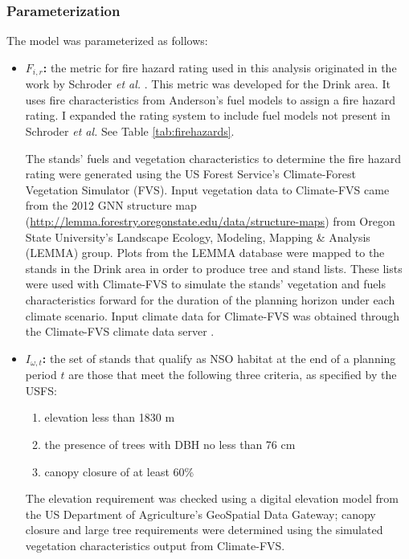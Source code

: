 \subsubsection{Parameterization}
The model was parameterized as follows:
\begin{itemize}
\item \textbf{$F_{i,r}$:} the metric for fire hazard rating used in this analysis originated in the work by Schroder \textit{et al.} \cite{schroder2016multi}. This metric was developed for the Drink area. It uses fire characteristics from Anderson's fuel models \cite{anderson1982aids} to assign a fire hazard rating. I expanded the rating system to include fuel models not present in Schroder \textit{et al.} See Table \ref{tab:firehazards}.

The stands' fuels and vegetation characteristics to determine the fire hazard rating were generated using the US Forest Service's Climate-Forest Vegetation Simulator (FVS). Input vegetation data to Climate-FVS came from the 2012 GNN structure map (\url{http://lemma.forestry.oregonstate.edu/data/structure-maps}) from Oregon State University's Landscape Ecology, Modeling, Mapping \& Analysis (LEMMA) group. Plots from the LEMMA database were mapped to the stands in the Drink area in order to produce tree and stand lists. These lists were used with Climate-FVS to simulate the stands' vegetation and fuels characteristics forward for the duration of the planning horizon under each climate scenario. Input climate data for Climate-FVS was obtained through the Climate-FVS climate data server \cite{climateFVSReadyData}.
\item \textbf{$I_{\omega,t}$:} the set of stands that qualify as NSO habitat at the end of a planning period $t$ are those that meet the following three criteria, as specified by the USFS:
	\begin{enumerate}
	\item elevation less than 1830 m
	\item the presence of trees with DBH no less than 76 cm
	\item canopy closure of at least 60\%
	\end{enumerate}
The elevation requirement was checked using a digital elevation model from the US Department of Agriculture's GeoSpatial Data Gateway; canopy closure and large tree requirements were determined using the simulated vegetation characteristics output from Climate-FVS.


\end{itemize}
